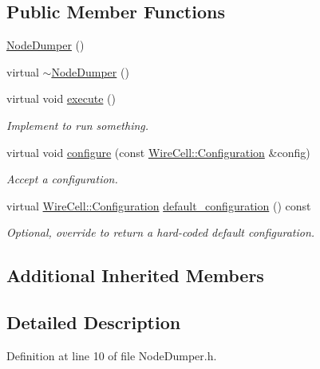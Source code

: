 \subsection*{Public Member Functions}
\begin{DoxyCompactItemize}
\item 
\hyperlink{class_wire_cell_apps_1_1_node_dumper_a564ad6be730e7c91005fd75af21170fc}{Node\+Dumper} ()
\item 
virtual \hyperlink{class_wire_cell_apps_1_1_node_dumper_a7147dd39241327806029bc67a1bfbbb7}{$\sim$\+Node\+Dumper} ()
\item 
virtual void \hyperlink{class_wire_cell_apps_1_1_node_dumper_a43d628cfd19e738b3bb2037ac901fd4b}{execute} ()
\begin{DoxyCompactList}\small\item\em Implement to run something. \end{DoxyCompactList}\item 
virtual void \hyperlink{class_wire_cell_apps_1_1_node_dumper_a36622747a05664c15d004e0c80869f93}{configure} (const \hyperlink{namespace_wire_cell_a9f705541fc1d46c608b3d32c182333ee}{Wire\+Cell\+::\+Configuration} \&config)
\begin{DoxyCompactList}\small\item\em Accept a configuration. \end{DoxyCompactList}\item 
virtual \hyperlink{namespace_wire_cell_a9f705541fc1d46c608b3d32c182333ee}{Wire\+Cell\+::\+Configuration} \hyperlink{class_wire_cell_apps_1_1_node_dumper_add7457528e1b13ef4bd3cb9331ee5911}{default\+\_\+configuration} () const
\begin{DoxyCompactList}\small\item\em Optional, override to return a hard-\/coded default configuration. \end{DoxyCompactList}\end{DoxyCompactItemize}
\subsection*{Additional Inherited Members}


\subsection{Detailed Description}


Definition at line 10 of file Node\+Dumper.\+h.



